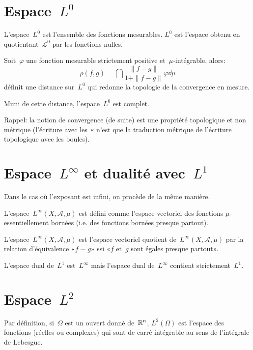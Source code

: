 \medskip
\section{Espace~$L^0$}
L'espace~$L^0$ est l'ensemble des fonctions mesurables.
$L^0$ est l'espace obtenu en quotientant~$\mathcal{L^0}$ par les fonctions nulles.

\medskip
Soit~$\varphi$ une fonction mesurable strictement positive et~$\mu$-intégrable, alors:
\begin{equation}
\rho(f,g)=\dint \frac{\|f-g\|}{1+\|f-g\|} \varphi \dd\mu
\end{equation}
définit une distance sur~$L^0$ qui redonne la topologie de la convergence en mesure.

\begin{theoreme}
Muni de cette distance, l'espace~$L^0$ est complet.
\end{theoreme}

\medskip
Rappel: la notion de convergence (de suite) est une propriété topologique et non métrique (l'écriture avec les~$\varepsilon$ n'est que la traduction métrique de l'écriture topologique avec les boules).

\medskip
\section{Espace~$L^\infty$ et dualité avec~$L^1$}
Dans le cas où l'exposant est infini, on procède de la même manière.

\medskip
L'espace~$L^\infty(X, \mathcal{A}, \mu)$ est défini comme l'espace vectoriel des fonctions $\mu$-essentiellement bornées (i.e. des fonctions bornées presque partout).

L'espace~$L^\infty(X, \mathcal{A}, \mu)$ est l'espace vectoriel quotient de~$L^\infty(X, \mathcal{A}, \mu)$
par la relation d'équivalence «$f \sim g$» ssi «$f$ et~$g$ sont égales presque partout».

\begin{theoreme}
L'espace dual de~$L^1$ est~$L^{\infty}$ mais l'espace dual de~$L^{\infty}$ contient strictement~$L^1$.
\end{theoreme}

\medskip
\section{Espace~$L^2$}

Par définition, si~$\Omega$ est un ouvert donné de~$\mathbb R^n$, $L^2(\Omega)$ est l'espace des fonctions (réelles ou complexes) qui sont de carré intégrable au sens de l'intégrale de Lebesgue.

